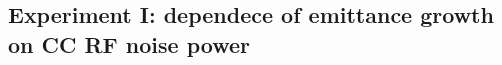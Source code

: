  

\newpage
 \subsection{Experiment I: dependece of emittance growth on CC RF noise power}\label{subsec:2022_exp1_bunch_length}
